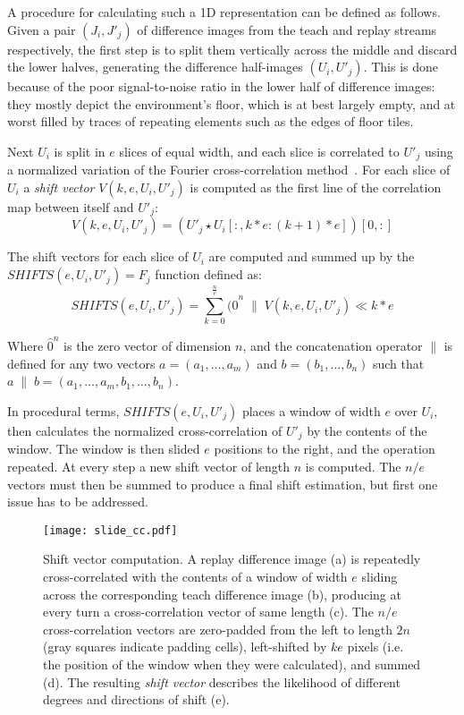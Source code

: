 \documentclass[twocolumn, 9pt,fleqn]{jsproceedings}
\begin{document}
A procedure for calculating such a 1D representation can be defined as follows. Given a pair $(J_i, J'_j)$ of difference images from the teach and replay streams respectively, the first step is to split them vertically across the middle and discard the lower halves, generating the difference half-images $(U_i, U'_j)$. This is done because of the poor signal-to-noise ratio in the lower half of difference images: they mostly depict the environment's floor, which is at best largely empty, and at worst filled by traces of repeating elements such as the edges of floor tiles.

Next $U_i$ is split in $e$ slices of equal width, and each slice is correlated to $U'_j$ using a normalized variation of the Fourier cross-correlation method~\cite{HEL14b}. For each slice of $U_i$ a \textit{shift vector} $V(k, e, U_i, U'_j)$ is computed as the first line of the correlation map between itself and $U'_j$:
\begin{equation}
V(k, e, U_i, U'_j) = (U'_j \star U_i[:, k*e:(k+1)*e])[0,:]
\end{equation}

The shift vectors for each slice of $U_i$ are computed and summed up by the $SHIFTS(e, U_i, U'_j) = F_j$ function defined as:
\begin{equation}
SHIFTS(e, U_i, U'_j) = \sum_{k=0}^{\frac{n}{e}}{(\hat{0}^n \; \| \; V(k, e, U_i, U'_j) \ll k*e}
\end{equation}

Where $\hat{0}^n$ is the zero vector of dimension $n$, and the concatenation operator $\|$ is defined for any two vectors $a = (a_1, \dotsc, a_m)$ and $b = (b_1, \dotsc, b_n)$ such that $a \; \| \; b = (a_1, \dotsc, a_m, b_1, \dotsc, b_n)$.

In procedural terms, $SHIFTS(e, U_i, U'_j)$ places a window of width $e$ over $U_i$, then calculates the normalized cross-correlation of $U'_j$ by the contents of the window. The window is then slided $e$ positions to the right, and the operation repeated. At every step a new shift vector of length $n$ is computed. The $n / e$ vectors must then be summed to produce a final shift estimation, but first one issue has to be addressed.

\begin{figure}[t]
\texttt{[image: slide\_cc.pdf]}
\caption{Shift vector computation. A replay difference image (a) is repeatedly cross-correlated with the contents of a window of width $e$ sliding across the corresponding teach difference image (b), producing at every turn a cross-correlation vector of same length (c). The $n / e$ cross-correlation vectors are zero-padded from the left to length $2n$ (gray squares indicate padding cells), left-shifted by $ke$ pixels (i.e. the position of the window when they were calculated), and summed (d). The resulting \textit{shift vector} describes the likelihood of different degrees and directions of shift (e).}
\label{fig:slide_cc}
\end{figure}
\end{document}
